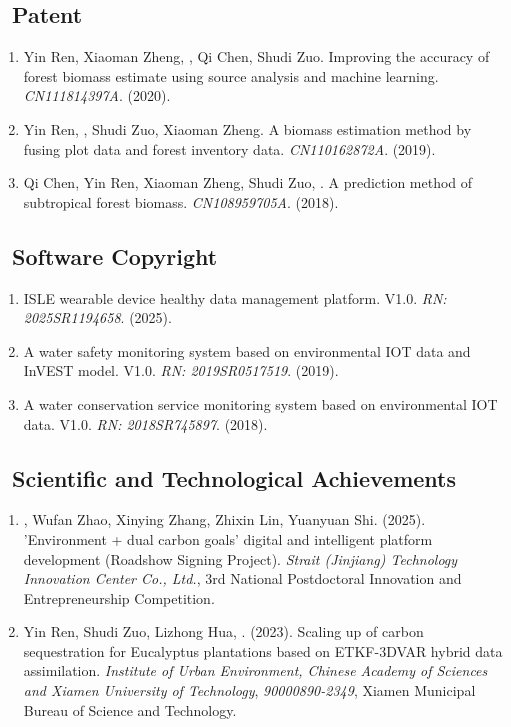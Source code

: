 \subsection*{\texorpdfstring{\faBook\ Patent}{Patent}}
\begin{enumerate}
\item
     Yin Ren, Xiaoman Zheng, \Shaoqing, Qi Chen, Shudi Zuo.
     Improving the accuracy of forest biomass estimate using source analysis and machine learning.
     \textit{CN111814397A}. (2020).
\item
     Yin Ren, \Shaoqing, Shudi Zuo, Xiaoman Zheng.
     A biomass estimation method by fusing plot data and forest inventory data.
     \textit{CN110162872A}. (2019).
\item
     Qi Chen, Yin Ren, Xiaoman Zheng, Shudi Zuo, \Shaoqing.
     A prediction method of subtropical forest biomass.
     \textit{CN108959705A}. (2018).
\end{enumerate}

\subsection*{\texorpdfstring{\faBook\ Software Copyright}{Software Copyright}}
\begin{enumerate}
\item
    ISLE wearable device healthy data management platform. V1.0.
    \textit{RN: 2025SR1194658}. (2025).
\item
    A water safety monitoring system based on environmental IOT data and InVEST model. V1.0.
    \textit{RN: 2019SR0517519}. (2019).
\item
    A water conservation service monitoring system based on environmental IOT data. V1.0.
    \textit{RN: 2018SR745897}. (2018).
\end{enumerate}

\subsection*{\texorpdfstring{\faBook\ Scientific and Technological Achievements}{Scientific and Technological Achievements}}
\begin{enumerate}
\item
    \Shaoqing, Wufan Zhao, Xinying Zhang, Zhixin Lin, Yuanyuan Shi. (2025).
    'Environment + dual carbon goals' digital and intelligent platform development (Roadshow Signing Project).
    \textit{Strait (Jinjiang) Technology Innovation Center Co., Ltd.},
    3rd National Postdoctoral Innovation and Entrepreneurship Competition.
\item
    Yin Ren, Shudi Zuo, Lizhong Hua, \Shaoqing. (2023).
    Scaling up of carbon sequestration for Eucalyptus plantations based on ETKF-3DVAR hybrid data assimilation.
    \textit{Institute of Urban Environment, Chinese Academy of Sciences and Xiamen University of Technology}, 
    \textit{90000890-2349}, Xiamen Municipal Bureau of Science and Technology.
\end{enumerate}

